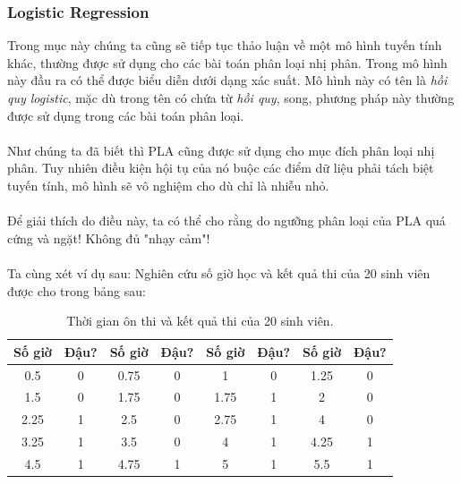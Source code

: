 \documentclass{article}
\begin{document}
\subsubsection{Logistic Regression}
Trong mục này chúng ta cũng sẽ tiếp tục thảo luận về một mô hình tuyến tính khác, thường được sử dụng cho các bài toán phân loại nhị phân. Trong mô hình này đầu ra có thể được biểu diễn dưới dạng xác suất. Mô hình này có tên là \textit{hồi quy logistic}, mặc dù trong tên có chứa từ \textit{hồi quy}, song, phương pháp này thường được sử dụng trong các bài toán phân loại.\\\\
Như chúng ta đã biết thì PLA cũng được sử dụng cho mục đích phân loại nhị phân. Tuy nhiên điều kiện hội tụ của nó buộc các điểm dữ liệu phải tách biệt tuyến tính, mô hình sẽ vô nghiệm cho dù chỉ là nhiễu nhỏ.\\\\
Để giải thích do điều này, ta có thể cho rằng do ngưỡng phân loại của PLA quá cứng và ngặt! Không đủ "nhạy cảm"!\\\\
Ta cùng xét ví dụ sau: Nghiên cứu số giờ học và kết quả thi của 20 sinh viên được cho trong bảng sau:
\begin{table}[ht!]
\centering
\caption{Thời gian ôn thi và kết quả thi của 20 sinh viên. }
\label{tab1}
\begin{tabular}{|c|c||c|c||c|c||c|c|}
\hline
\textbf{Số giờ} & \textbf{Đậu?} & \textbf{Số giờ} & \textbf{Đậu?} & \textbf{Số giờ} & \textbf{Đậu?} & \textbf{Số giờ} & \textbf{Đậu?} \\ \hline \hline 
0.5            & 0             & 0.75           & 0             & 1              & 0             & 1.25           & 0             \\ \hline
1.5            & 0             & 1.75           & 0             & 1.75           & 1             & 2              & 0             \\ \hline
2.25           & 1             & 2.5            & 0             & 2.75           & 1             & 4              & 0             \\ \hline
3.25           & 1             & 3.5            & 0             & 4              & 1             & 4.25           & 1             \\ \hline
4.5            & 1             & 4.75           & 1             & 5              & 1             & 5.5            & 1             \\ \hline
\end{tabular}
\end{table}
\end{document}
